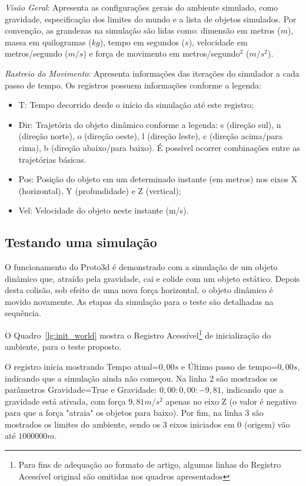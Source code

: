 \documentclass[12pt]{article}
\begin{document}
\emph{Visão Geral}: Apresenta as configurações gerais do ambiente simulado, como gravidade, especificação dos limites do mundo e a lista de objetos simulados. Por convenção, as grandezas na simulação são lidas como: dimensão em metros ($m$), massa em quilogramas ($kg$), tempo em segundos ($s$), velocidade em metros/segundo ($m/s$) e força de movimento em metros/segundo$^{2}$ ($m/s^{2}$).

\emph{Rastreio do Movimento}: Apresenta informações das iterações do simulador a cada passo de tempo. Os registros possuem informações conforme a legenda:

\begin{itemize}
	\item T: Tempo decorrido desde o início da simulação até este registro;
	\item Dir: Trajetória do objeto dinâmico conforme a legenda: s (direção sul), n (direção norte), o (direção oeste), l (direção leste), c (direção acima/para cima), b (direção abaixo/para baixo). É possível ocorrer combinações entre as trajetórias básicas. 
	\item Pos: Posição do objeto em um determinado instante (em metros) nos eixos X (horizontal), Y (profundidade) e Z (vertical);
	\item Vel: Velocidade do objeto neste instante (m/s).
\end{itemize}

\subsection{Testando uma simulação}
O funcionamento do Proto3d é demonstrado com a simulação de um objeto dinâmico que, atraído pela gravidade, cai e colide com um objeto estático. Depois desta colisão, sob efeito de uma nova força horizontal, o objeto dinâmico é movido novamente. As etapas da simulação para o teste são detalhadas na sequência. 

O Quadro~\ref{lg:init_world} mostra o Registro Acessível\footnote{Para fins de adequação ao formato de artigo, algumas linhas do Registro Acessível original são omitidas nos quadros apresentados} de inicialização do ambiente, para o teste proposto.

O registro inicia mostrando Tempo atual=$0,00s$ e Último passo de tempo=$0,00s$, indicando que a simulação ainda não começou. Na linha 2 são mostrados os parâmetros Gravidade=True e Gravidade: $0,00:0,00:-9,81$, indicando que a gravidade está ativada, com força $9,81 m/s^{2}$ apenas no eixo Z (o valor é negativo para que a força "atraia" os objetos para baixo). Por fim, na linha 3 são mostrados os limites do ambiente, sendo os 3 eixos iniciados em $0$ (origem) vão até $1000000m$.
\end{document}
